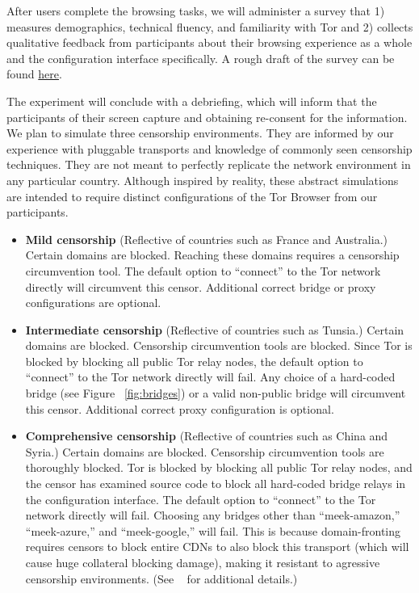 \documentclass{template}
\begin{document}
After users complete the browsing tasks, we will administer a survey that 1)
measures demographics, technical fluency, and
familiarity with Tor and 2) collects qualitative feedback from
participants about their browsing experience as a whole
and the configuration interface specifically.
A rough draft of the survey can be
found
\href{http://www.surveygizmo.com/collab/2085559/Tor-Usability-Survey}{here}.

The experiment will conclude with a debriefing, which will inform that the
participants of their screen capture and obtaining re-consent for the
information. \\

We plan to simulate three censorship environments.
They are informed by our experience with pluggable transports
and knowledge of commonly seen censorship techniques.
They are not meant to perfectly replicate the network environment
in any particular country. Although inspired by reality, these
abstract simulations are intended to require distinct configurations
of the Tor Browser from our participants. \\

\begin{itemize} \itemsep1pt \parskip0pt 
\item {\bfseries Mild censorship} 
(Reflective of countries such as France and Australia.)
Certain domains are blocked. Reaching these 
domains requires a censorship circumvention 
tool. The default option to ``connect'' to the Tor network 
directly will circumvent this censor. Additional correct
bridge or proxy configurations are optional. 
\item {\bfseries Intermediate censorship} 
(Reflective of countries such as Tunsia.)
Certain domains are blocked. Censorship circumvention
tools are blocked. Since Tor is blocked by blocking all public Tor
relay nodes, the default option to ``connect'' to the Tor network
directly will fail. Any choice of a hard-coded bridge (see Figure ~\ref{fig:bridges})
or a valid non-public bridge will circumvent this censor.  
Additional correct proxy configuration is optional.
\item {\bfseries Comprehensive censorship} 
(Reflective of countries such as China and Syria.)
Certain domains are blocked. Censorship circumvention tools
are thoroughly blocked. Tor is blocked by blocking all public
Tor relay nodes, and the censor has examined source code to block
all hard-coded bridge relays in the configuration interface. The default option
to ``connect'' to the Tor network directly will fail. Choosing any bridges other than
``meek-amazon,'' ``meek-azure,'' and ``meek-google,'' will fail. This is because 
domain-fronting requires censors to block entire CDNs to also block this
transport (which will cause huge collateral blocking damage), making it resistant to agressive censorship environments.
(See ~\cite{fifield2015blocking} for additional details.)\\
\end{itemize}
\end{document}
